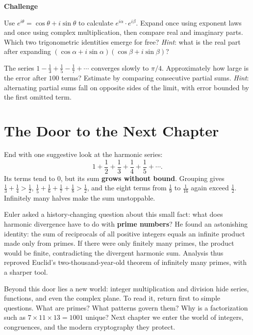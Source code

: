 \textbf{Challenge}
\begin{sikao}
  \setcounter{sikaoi}{4}
  \item Use $e^{i\theta}=\cos\theta+i\sin\theta$ to calculate $e^{i\alpha}\cdot e^{i\beta}$. Expand once using exponent laws and once using complex multiplication, then compare real and imaginary parts. Which two trigonometric identities emerge for free? \emph{Hint}: what is the real part after expanding $(\cos\alpha+i\sin\alpha)(\cos\beta+i\sin\beta)$?
  \item The series $1-\frac13+\frac15-\frac17+\cdots$ converges slowly to $\pi/4$. Approximately how large is the error after $100$ terms? Estimate by comparing consecutive partial sums. \emph{Hint}: alternating partial sums fall on opposite sides of the limit, with error bounded by the first omitted term.
\end{sikao}

\section*{The Door to the Next Chapter}

End with one suggestive look at the harmonic series:
\[
1+\frac12+\frac13+\frac14+\frac15+\cdots .
\]
Its terms tend to $0$, but its sum \textbf{grows without bound}. Grouping gives $\frac13+\frac14>\frac12$, $\frac15+\frac16+\frac17+\frac18>\frac12$, and the eight terms from $\frac19$ to $\frac1{16}$ again exceed $\frac12$. Infinitely many halves make the sum unstoppable.

Euler asked a history-changing question about this small fact: what does harmonic divergence have to do with \textbf{prime numbers}? He found an astonishing identity: the sum of reciprocals of all positive integers equals an infinite product made only from primes. If there were only finitely many primes, the product would be finite, contradicting the divergent harmonic sum. Analysis thus reproved Euclid's two-thousand-year-old theorem of infinitely many primes, with a sharper tool.

Beyond this door lies a new world: integer multiplication and division hide series, functions, and even the complex plane. To read it, return first to simple questions. What are primes? What patterns govern them? Why is a factorization such as $7\times 11\times 13=1001$ unique? Next chapter we enter the world of integers, congruences, and the modern cryptography they protect.
